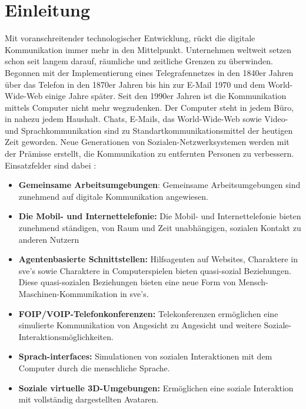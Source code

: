 \documentclass[a4paper,11pt]{article}%
\renewcommand{\\}{\vspace*{0.5\baselineskip} \newline}
\begin{document}
\section*{Einleitung}
	Mit voranschreitender technologischer Entwicklung, rückt die digitale Kommunikation immer mehr in den Mittelpunkt. Unternehmen weltweit setzen schon seit langem darauf, räumliche und zeitliche Grenzen zu überwinden. Begonnen mit der Implementierung eines Telegrafennetzes in den 1840er Jahren über das Telefon in den 1870er Jahren bis hin zur E-Mail 1970 und dem World-Wide-Web einige Jahre später.
	Seit den 1990er Jahren ist die Kommunikation mittels Computer nicht mehr wegzudenken. Der Computer steht in jedem Büro, in nahezu jedem Haushalt. Chats, E-Mails, das World-Wide-Web sowie Video- und Sprachkommunikation sind zu Standartkommunikationsmittel der heutigen Zeit geworden. \citep[p. 14-16]{thurlow2004computer} \\ 
Neue Generationen von Sozialen-Netzwerksystemen werden mit der Prämisse erstellt, die Kommunikation zu entfernten Personen zu verbessern.
Einsatzfelder sind dabei :
\begin{itemize}
	\item{\textbf{Gemeinsame Arbeitsumgebungen}: Gemeinsame Arbeitsumgebungen sind zunehmend auf digitale Kommunikation angewiesen.}
	\item{\textbf{Die Mobil- und Internettelefonie:} Die Mobil- und Internettelefonie bieten zunehmend ständigen, von Raum und Zeit unabhängigen, sozialen Kontakt zu anderen Nutzern}
	\item{\textbf{Agentenbasierte Schnittstellen:} Hilfsagenten auf Websites, Charaktere in \ac{sve}'s sowie Charaktere in Computerspielen bieten \dq{}quasi\dq{}-sozial Beziehungen. Diese \dq{}quasi\dq{}-sozialen Beziehungen bieten eine neue Form von Mensch-Maschinen-Kommunikation in \ac{sve}'s.} 
	\item{\textbf{FOIP/VOIP-Telefonkonferenzen:} Telekonferenzen ermöglichen eine simulierte Kommunikation von Angesicht zu Angesicht und weitere Soziale-Interaktionsmöglichkeiten.}
	\item{\textbf{Sprach-interfaces:} Simulationen von sozialen Interaktionen mit dem Computer durch die menschliche Sprache.}
	\item{\textbf{Soziale virtuelle 3D-Umgebungen:} Ermöglichen eine soziale Interaktion mit vollständig dargestellten Avataren.}
\end{itemize}
\end{document}
